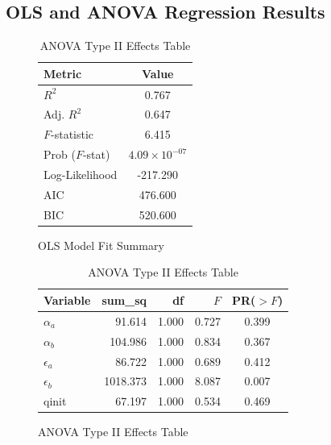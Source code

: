 \documentclass{article}
\begin{document}
\subsection*{OLS and ANOVA Regression Results}
\label{sec:statistical_results}

\begin{table}[htbp]
    \centering
    
    \begin{subfigure}[b]{0.35\textwidth}
        \centering
        \caption{OLS Model Fit Summary}
        \label{tab:ols_summary}
        \begin{tabular}{lc}
            \toprule
            \textbf{Metric} & \textbf{Value} \\ 
            \midrule
            $R^2$ & 0.767 \\
            Adj. $R^2$ & 0.647 \\
            $F$-statistic & 6.415 \\
            Prob ($F$-stat) & $4.09 \times 10^{-07}$ \\
            Log-Likelihood & -217.290 \\
            AIC & 476.600 \\
            BIC & 520.600 \\ 
            \bottomrule
        \end{tabular}
    \end{subfigure}
    \hfill
    \begin{subfigure}[b]{0.58\textwidth}
        \centering
        \caption{ANOVA Type II Effects Table}
        \label{tab:anova_results}
        \begin{tabular}{lrrrc}
            \toprule
            \textbf{Variable} & \textbf{sum\_sq} & \textbf{df} & \textbf{$F$} & \textbf{PR($>F$)} \\ 
            \midrule
            $\alpha_a$ & 91.614 & 1.000 & 0.727 & 0.399 \\
            $\alpha_b$ & 104.986 & 1.000 & 0.834 & 0.367 \\
            $\epsilon_a$ & 86.722 & 1.000 & 0.689 & 0.412 \\
            $\epsilon_b$ & 1018.373 & 1.000 & 8.087 & 0.007 \\
            qinit & 67.197 & 1.000 & 0.534 & 0.469 \\ 
            \bottomrule
        \end{tabular}
    \end{subfigure}
    

\end{table}
\end{document}
